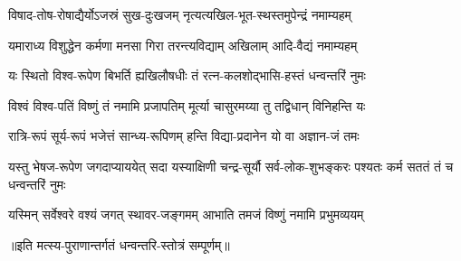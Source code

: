 \twolineshloka
{विषाद-तोष-रोषाद्यैर्योऽजस्रं सुख-दुःखजम्}
{नृत्यत्यखिल-भूत-स्थस्तमुपेन्द्रं नमाम्यहम्}%

\twolineshloka
{यमाराध्य विशुद्धेन कर्मणा मनसा गिरा}
{तरन्त्यविद्याम् अखिलाम् आदि-वैद्यं नमाम्यहम्}%

\twolineshloka
{यः स्थितो विश्व-रूपेण बिभर्ति ह्यखिलौषधीः}
{तं रत्न-कलशोद्भासि-हस्तं धन्वन्तरिं नुमः}%

\twolineshloka
{विश्वं विश्व-पतिं विष्णुं तं नमामि प्रजापतिम्}
{मूर्त्या चासुरमय्या तु तद्विधान् विनिहन्ति यः}%

\twolineshloka
{रात्रि-रूपं सूर्य-रूपं भजेत्तं सान्ध्य-रूपिणम्}
{हन्ति विद्या-प्रदानेन यो वा अज्ञान-जं तमः}%

\threelineshloka
{यस्तु भेषज-रूपेण जगदाप्याययेत् सदा}
{यस्याक्षिणी चन्द्र-सूर्यौ सर्व-लोक-शुभङ्करः}
{पश्यतः कर्म सततं तं च धन्वन्तरिं नुमः}%

\twolineshloka
{यस्मिन् सर्वेश्वरे वश्यं जगत् स्थावर-जङ्गमम्}
{आभाति तमजं विष्णुं नमामि प्रभुमव्ययम्}%

॥इति मत्स्य-पुराणान्तर्गतं धन्वन्तरि-स्तोत्रं सम्पूर्णम्॥
